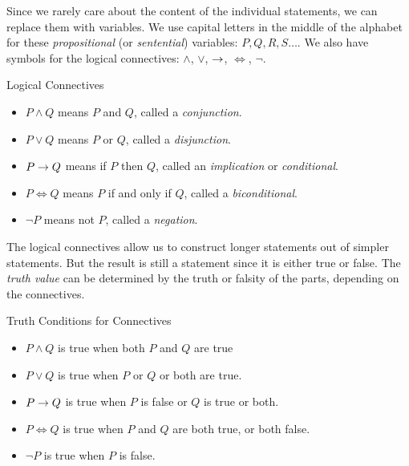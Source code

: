 \documentclass[12pt]{article}
\begin{document}
Since we rarely care about the content of the individual statements, we can replace them with variables.  We use capital letters in the middle of the alphabet for these {\em propositional} (or {\em sentential}) variables: $P, Q, R, S\ldots$.  We also have symbols for the logical connectives: $\wedge$, $\vee$, $\rightarrow$, $\iff$, $\neg$.

\begin{defbox}{Logical Connectives}
\begin{itemize}
 \item $P \wedge Q$ means  $P$ and $Q$, called a {\em conjunction}.
\item $P \vee Q$ means $P$ or $Q$, called a {\em disjunction}.
\item $P \rightarrow Q$ means if $P$ then $Q$, called an {\em implication} or {\em conditional}.
\item $P \iff Q$ means $P$ if and only if $Q$, called a {\em biconditional}.
\item $\neg P$ means not $P$, called a {\em negation}.
\end{itemize}
\end{defbox}

The logical connectives allow us to construct longer statements out of simpler statements.  But the result is still a statement since it is either true or false.  The {\em truth value} can be determined by the truth or falsity of the parts, depending on the connectives.  


\begin{defbox}{Truth Conditions for Connectives}
\begin{itemize}
 \item $P \wedge Q$ is true when both $P$ and $Q$ are true
\item $P \vee Q$ is true when $P$ or $Q$ or both are true.
\item $P \rightarrow Q$ is true when $P$ is false or $Q$ is true or both.
\item $P \iff Q$ is true when $P$ and $Q$ are both true, or both false.
\item $\neg P$ is true when $P$ is false. 
\end{itemize}
\end{defbox}
\end{document}
